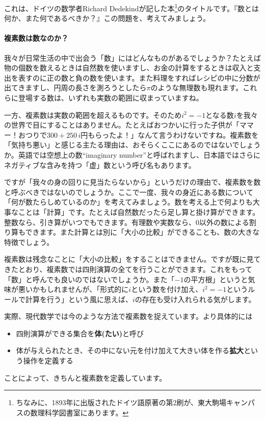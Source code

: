 これは、ドイツの数学者Richard Dedekindが記した本\footnote{ちなみに、1893年に出版されたドイツ語原著の第2刷が、東大駒場キャンパスの数理科学図書室にあります。}のタイトルです。『数とは何か、また何であるべきか？』この問題を、考えてみましょう。

\paragraph{複素数は数なのか？}

我々が日常生活の中で出会う「数」にはどんなものがあるでしょうか？たとえば物の個数を数えるときは自然数を使いますし、お金の計算をするときは収入と支出を表すのに正の数と負の数を使います。また料理をすればレシピの中に分数が出てきますし、円周の長さを測ろうとしたら$\pi$のような無理数も現れます。これらに登場する数は、いずれも実数の範囲に収まっていますね。

一方、複素数は実数の範囲を超えるものです。そのため$i^2=-1$となる数$i$を我々の世界で目にすることはありません。たとえばおつかいに行った子供が「ママー！\negthinspace おつりで$300+250\,i$円もらったよ！」なんて言うわけないですね。複素数を「気持ち悪い」と感じる主たる理由は、おそらくここにあるのではないでしょうか。英語では空想上の数``imaginary number''と呼ばれますし、日本語ではさらにネガティブな含みを持つ「虚」数という呼び名もあります。

ですが「我々の身の回りに見当たらないから」というだけの理由で、複素数を数と呼ぶべきではないのでしょうか。ここで一度、我々の身近にある数について「何が数たらしめているのか」を考えてみましょう。数を考える上で何よりも大事なことは「計算」です。たとえば自然数だったら足し算と掛け算ができます。整数なら、引き算がいつでもできます。有理数や実数なら、$0$以外の数による割り算もできます。また計算とは別に「大小の比較」ができることも、数の大きな特徴でしょう。

複素数は残念なことに「大小の比較」をすることはできません。ですが既に見てきたとおり、複素数では四則演算の全てを行うことができます。これをもって「数」と呼んでも良いのではないでしょうか。また「$-1$の平方根」というと気味が悪いかもしれませんが、「形式的に$i$という数を付け加え、$i^2=-1$というルールで計算を行う」という風に思えば、$i$の存在も受け入れられる気がします。

実際、現代数学では今のような方法で複素数を捉えています。より具体的には
\begin{itemize}
\item 四則演算ができる集合を\textbf{体(たい)}と呼び
\item 体が与えられたとき、その中にない元を付け加えて大きい体を作る\textbf{拡大}という操作を定義する
\end{itemize}
ことによって、きちんと複素数を定義しています。


